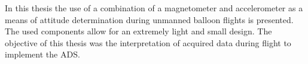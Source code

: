 In this thesis the use of a combination of a magnetometer and accelerometer as a means of attitude determination during unmanned balloon flights is presented. The used components allow for an extremely light and small design. The objective of this thesis was the interpretation of acquired data during flight to implement the \ac{ADS}.